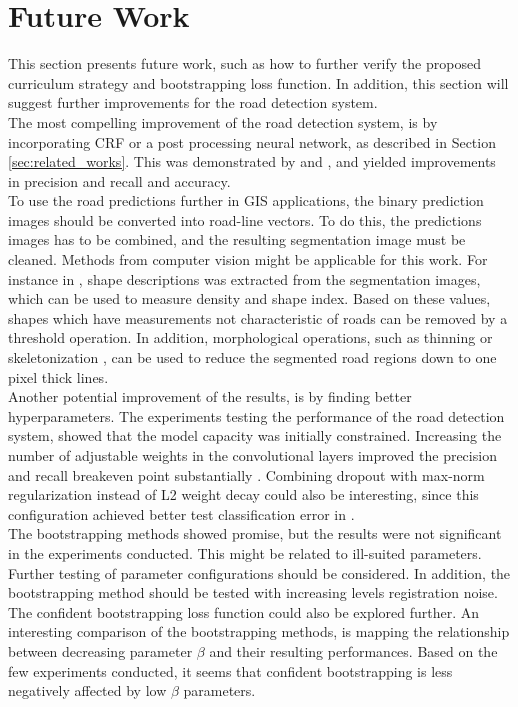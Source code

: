 \section{Future Work}
\label{sec:futureWork}
This section presents future work, such as how to further verify the proposed curriculum strategy and bootstrapping loss function. In addition, this section will suggest further improvements for the road detection system.\\

The most compelling improvement of the road detection system, is by incorporating \ac{CRF} or a post processing neural network, as described in Section \ref{sec:related_works}. This was demonstrated by \cite{Kluckner_semantic_height} and \cite{Mnih_aerial_images_noisy} , and yielded improvements in precision and recall and accuracy. \\

To use the road predictions further in GIS applications, the binary prediction images should be converted into road-line vectors. To do this, the predictions images has to be combined, and the resulting segmentation image must be cleaned. Methods from computer vision might be applicable for this work. For instance in \citep{Song_road_extraction_svm}, shape descriptions was extracted from the segmentation images, which can be used to measure density and shape index. Based on these values, shapes which have measurements not characteristic of roads can be removed by a threshold operation. In addition, morphological operations, such as thinning or skeletonization , can be used to reduce the segmented road regions down to one pixel thick lines. \\

Another potential improvement of the results, is by finding better hyperparameters. The experiments testing the performance of the road detection system, showed that the model capacity was initially constrained. Increasing the number of adjustable weights in the convolutional layers improved the precision and recall breakeven point substantially . Combining dropout with max-norm regularization instead of L2 weight decay could also be interesting, since this configuration achieved better test classification error in \citep{Srivastava_dropout}.\\

The bootstrapping methods showed promise, but the results were not significant in the experiments conducted. This might be related to ill-suited parameters. Further testing of parameter configurations should be considered. In addition, the bootstrapping method should be tested with increasing levels registration noise. The confident bootstrapping loss function could also be explored further. An interesting comparison of the bootstrapping methods, is mapping the relationship between decreasing parameter $\beta$ and their resulting performances. Based on the few experiments conducted, it seems that confident bootstrapping is less negatively affected by low $\beta$ parameters.\\


